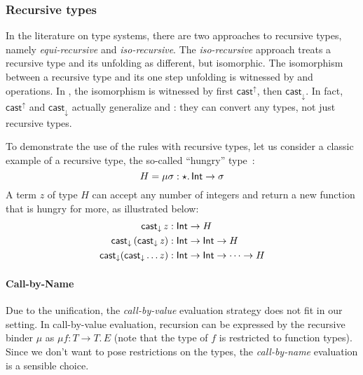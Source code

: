 \subsubsection{Recursive types}
In the literature on type systems, there are two approaches to
recursive types, namely \emph{equi-recursive} and
\emph{iso-recursive}. The \emph{iso-recursive} approach treats a
recursive type and its unfolding as different, but isomorphic. The
isomorphism between a recursive type and its one step unfolding is
witnessed by \fold and \unfold operations. In \name, the
isomorphism is witnessed by first $ \mathsf{cast}^{\uparrow} $, then
$ \mathsf{cast}_{\downarrow} $. In fact, $ \mathsf{cast}^{\uparrow} $ and
$ \mathsf{cast}_{\downarrow} $ actually generalize \fold and \unfold: they can convert
any types, not just recursive types. 

To demonstrate the use of the
\cast rules with recursive types, let us consider a classic example of a recursive type,
the so-called ``hungry'' type~\cite{tapl}:
\[H = \mu \sigma:\star.\,\mathsf{Int} \rightarrow \sigma\]
A term $z$
of type $H$ can accept any number of integers and return a new
function that is hungry for more, as illustrated below:
\begin{align*}
\mathsf{cast}_{\downarrow} \, \mathit{z} &:  \mathsf{Int}  \rightarrow H  \\
\mathsf{cast}_{\downarrow} \, (  \mathsf{cast}_{\downarrow} \, \mathit{z}  ) &:  \mathsf{Int}  \rightarrow  \mathsf{Int}  \rightarrow H \\
 \mathsf{cast}_{\downarrow} ( \mathsf{cast}_{\downarrow}  \dots z) &:  \mathsf{Int}  \rightarrow  \mathsf{Int}  \rightarrow \dots \rightarrow H
\end{align*}


\paragraph{Call-by-Name}
Due to the unification, the \emph{call-by-value} evaluation strategy
does not fit in our setting. In call-by-value evaluation, recursion
can be expressed by the recursive binder $\mu$ as $\mu f : T
\rightarrow T.\, E$ (note that the type of $f$ is restricted to
function types). Since we don't want to pose restrictions on the
types, the \emph{call-by-name} evaluation is a sensible choice.

